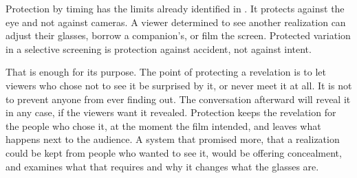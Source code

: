 Protection by timing has the limits already identified in . It protects against the eye and not against cameras. A viewer determined to see another realization can adjust their glasses, borrow a companion's, or film the screen. Protected variation in a selective screening is protection against accident, not against intent.

That is enough for its purpose. The point of protecting a revelation is to let viewers who chose not to see it be surprised by it, or never meet it at all. It is not to prevent anyone from ever finding out. The conversation afterward will reveal it in any case, if the viewers want it revealed. Protection keeps the revelation for the people who chose it, at the moment the film intended, and leaves what happens next to the audience. A system that promised more, that a realization could be kept from people who wanted to see it, would be offering concealment, and  examines what that requires and why it changes what the glasses are.
